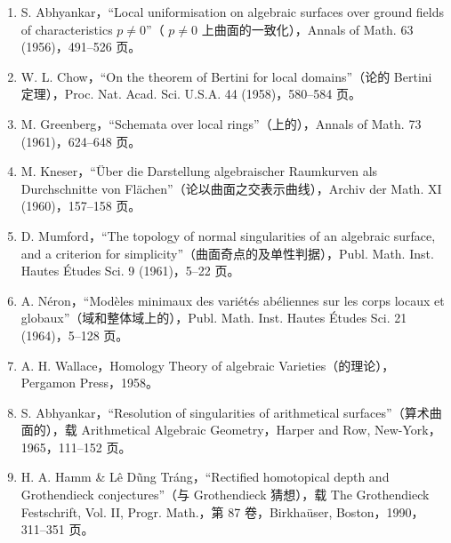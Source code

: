 \begin{enumerate}
\item[{[1]}] S. Abhyankar，“Local uniformisation on algebraic surfaces over ground fields of characteristics $p\ne0$”（ $p\ne0$ 上曲面的一致化），Annals of Math. 63 (1956)，491--526 页。
\item[{[2]}] W. L. Chow，“On the theorem of Bertini for local domains”（论的 Bertini 定理），Proc. Nat. Acad. Sci. U.S.A. 44 (1958)，580--584 页。
\item[{[3]}] M. Greenberg，“Schemata over local rings”（上的），Annals of Math. 73 (1961)，624--648 页。
\item[{[4]}] M. Kneser，“Über die Darstellung algebraischer Raumkurven als Durchschnitte von Flächen”（论以曲面之交表示曲线），Archiv der Math. XI (1960)，157--158 页。
\item[{[5]}] D. Mumford，“The topology of normal singularities of an algebraic surface, and a criterion for simplicity”（曲面奇点的及单性判据），Publ. Math. Inst. Hautes Études Sci. 9 (1961)，5--22 页。
\item[{[6]}] A. Néron，“Modèles minimaux des variétés abéliennes sur les corps locaux et globaux”（域和整体域上的），Publ. Math. Inst. Hautes Études Sci. 21 (1964)，5--128 页。
\item[{[7]}] A. H. Wallace，Homology Theory of algebraic Varieties（的理论），Pergamon Press，1958。
\item[{[8]}] S. Abhyankar，“Resolution of singularities of arithmetical surfaces”（算术曲面的），载 Arithmetical Algebraic Geometry，Harper and Row, New-York，1965，111--152 页。
\item[{[HL]}] H. A. Hamm \& Lê Dũng Tráng，“Rectified homotopical depth and Grothendieck conjectures”（与 Grothendieck 猜想），载 The Grothendieck Festschrift, Vol. II, Progr. Math.，第 87 卷，Birkhaüser, Boston，1990，311--351 页。
\end{enumerate}
